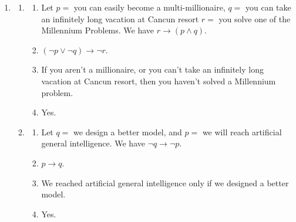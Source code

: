 \documentclass[12pt]{article}
\theoremstyle{definition}
\theoremstyle{remark}
\newcommand{\ra}{\rightarrow}
\begin{document}
\begin{enumerate}[leftmargin=\labelsep]
	\newpage
	\item 
	\begin{enumerate}
		\item 
		\begin{enumerate}
			\item Let $p = $ you can easily become a multi-millionaire, $q = $ you can take an infinitely long vacation at Cancun resort $r = $ you solve one of the Millennium Problems. We have $r \ra (p \land q)$.
			\item 
			$(\lnot p \lor \lnot q) \ra \lnot r$.
			\item If you aren't a millionaire, or you can't take an infinitely long vacation at Cancun resort, then you haven't solved a Millennium problem.
			\item Yes.
		\end{enumerate}
		\item 
		\begin{enumerate}
			\item Let $q = $ we design a better model, and $p = $ we will reach artificial general intelligence. We have $\lnot q \ra \lnot p$.
			\item 
			$p \ra q$. 
			\item We reached artificial general intelligence only if we designed a better model.
			\item Yes.
		\end{enumerate}
	\end{enumerate}


\end{enumerate}
\end{document}
